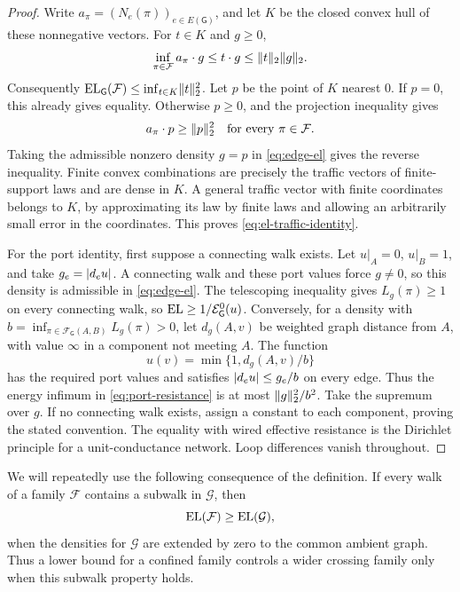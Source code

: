 \begin{proof}
Write \(a_\pi=(N_e(\pi))_{e\in E(\mathsf G)}\), and let \(K\) be the closed
convex hull of these nonnegative vectors.  For \(t\in K\) and \(g\ge0\),
\[
 \inf_{\pi\in\mathcal F}a_\pi\cdot g
 \le t\cdot g\le\lVert t\rVert_2\lVert g\rVert_2.
\]
Consequently \(\operatorname{EL}_{\mathsf G}(\mathcal F)\le\inf_{t\in K}\lVert t\rVert_2^2\).
Let \(p\) be the point of \(K\) nearest \(0\).  If \(p=0\), this already
gives equality.  Otherwise \(p\ge0\), and the projection inequality gives
\[
 a_\pi\cdot p\ge\lVert p\rVert_2^2
 \quad\hbox{for every }\pi\in\mathcal F.
\]
Taking the admissible nonzero density \(g=p\) in \eqref{eq:edge-el} gives
the reverse inequality.  Finite convex combinations are precisely the
traffic vectors of finite-support laws and are dense in \(K\).  A general
traffic vector with finite coordinates belongs to \(K\), by approximating
its law by finite laws and allowing an arbitrarily small error in the
coordinates.  This proves \eqref{eq:el-traffic-identity}.

For the port identity, first suppose a connecting walk exists.  Let
\(u|_A=0\), \(u|_B=1\), and take
\(g_e=\lvert d_eu\rvert\).  A connecting walk and these port values force
\(g\ne0\), so this density is admissible in \eqref{eq:edge-el}.
The telescoping inequality gives \(L_g(\pi)\ge1\) on
every connecting walk, so \(\operatorname{EL}\ge1/\mathcal E_{\mathsf G}^0(u)\).
Conversely, for a density with
\(b=\inf_{\pi\in\mathcal F_{\mathsf G}(A,B)}L_g(\pi)>0\), let \(d_g(A,v)\)
be weighted graph distance from \(A\), with value \(\infty\) in a component
not meeting \(A\).  The function
\[
 u(v)=\min\{1,d_g(A,v)/b\}
\]
has the required port values and satisfies
\(\lvert d_eu\rvert\le g_e/b\) on every edge.  Thus the energy infimum in
\eqref{eq:port-resistance} is at most \(\lVert g\rVert_2^2/b^2\).  Take the
supremum over \(g\).  If no connecting walk exists, assign a constant to
each component, proving the stated convention.  The equality with wired
effective resistance is the Dirichlet principle for a unit-conductance
network.  Loop differences vanish throughout.
\end{proof}

We will repeatedly use the following consequence of the definition.  If
every walk of a family \(\mathcal F\) contains a subwalk in
\(\mathcal G\), then
\begin{equation}\label{eq:el-subpassage}
 \operatorname{EL}(\mathcal F)\ge\operatorname{EL}(\mathcal G),
\end{equation}
when the densities for \(\mathcal G\) are extended by zero to the common
ambient graph.  Thus a lower bound for a confined family controls a wider
crossing family only when this subwalk property holds.

